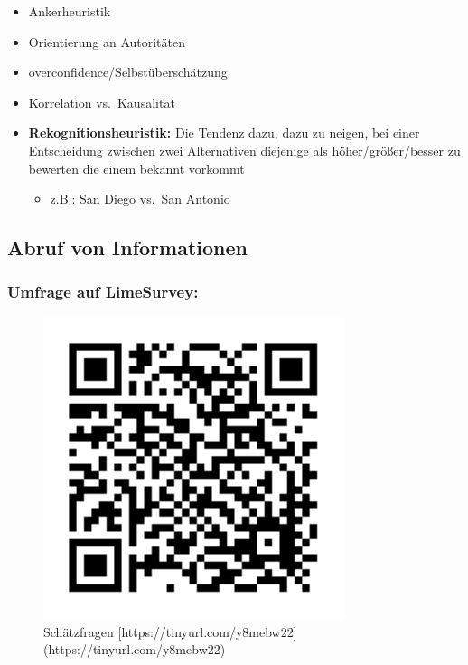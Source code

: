 \documentclass[
]{book}
\providecommand{\tightlist}{%
  \setlength{\itemsep}{0pt}\setlength{\parskip}{0pt}}
\begin{document}
\begin{itemize}
\item
  Ankerheuristik
\item
  Orientierung an Autoritäten
\item
  overconfidence/Selbstüberschätzung
\item
  Korrelation vs.~Kausalität
\item
  \textbf{Rekognitionsheuristik:} Die Tendenz dazu, dazu zu neigen, bei einer Entscheidung zwischen zwei Alternativen diejenige als höher/größer/besser zu bewerten die einem bekannt vorkommt

  \begin{itemize}
  \tightlist
  \item
    z.B.: San Diego vs.~San Antonio
  \end{itemize}
\end{itemize}

\hypertarget{abruf-von-informationen}{%
\subsection{Abruf von Informationen}\label{abruf-von-informationen}}

\hypertarget{umfrage-auf-limesurvey-1}{%
\subsubsection{Umfrage auf LimeSurvey:}\label{umfrage-auf-limesurvey-1}}

\begin{figure}

{\centering \includegraphics[width=250pt]{imgs/Hindsight} 

}

\caption{Schätzfragen [https://tinyurl.com/y8mebw22](https://tinyurl.com/y8mebw22)}\label{fig:unnamed-chunk-16}
\end{figure}
\end{document}
